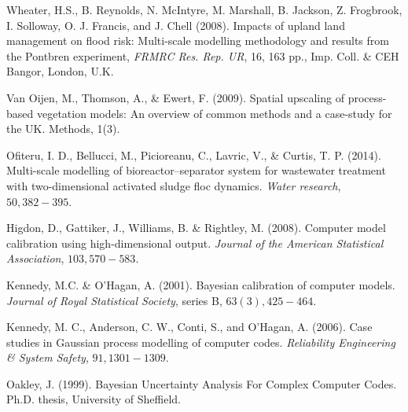 \begin{thebibliography}{94}
  Wheater, H.S., B. Reynolds, N. McIntyre, M. Marshall, B. Jackson, Z. Frogbrook, I. Solloway, O. J. Francis, and J. Chell (2008). Impacts of upland land management on flood risk: Multi-scale modelling methodology and results from the Pontbren experiment, {\it FRMRC Res. Rep. UR}, 16, 163 pp., Imp. Coll. \& CEH Bangor, London, U.K.

  Van Oijen, M., Thomson, A., \& Ewert, F. (2009). Spatial upscaling of process-based vegetation models: An overview of common methods and a case-study for the UK. Methods, 1(3).
 
 Ofiteru, I. D., Bellucci, M., Picioreanu, C., Lavric, V., \& Curtis, T. P. (2014). Multi-scale modelling of bioreactor–separator system for wastewater treatment with two-dimensional activated sludge floc dynamics. {\it Water research}, $50, 382-395$.






 Higdon, D., Gattiker, J., Williams, B. \& Rightley, M. (2008). Computer model calibration using high-dimensional output. {\it Journal of the American Statistical Association}, $103, 570-583$.


 Kennedy, M.C. \& O'Hagan, A. (2001). Bayesian calibration of computer models. {\it Journal of Royal Statistical Society}, series B, $63(3), 425-464$.

 Kennedy, M. C., Anderson, C. W., Conti, S., and O'Hagan, A. (2006). Case studies in Gaussian process modelling of computer codes. {\it Reliability Engineering \& System Safety}, $91, 1301-1309$.





 Oakley, J. (1999). Bayesian Uncertainty Analysis For Complex Computer Codes. Ph.D. thesis, University of Sheffield.


\end{thebibliography}
